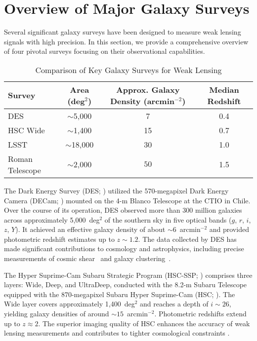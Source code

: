 \section{Overview of Major Galaxy Surveys}
Several significant galaxy surveys have been designed to measure weak lensing signals with high precision. In this section, we provide a comprehensive overview of four pivotal surveys focusing on their observational capabilities.
\begin{table}[h]
    \centering
    \caption{Comparison of Key Galaxy Surveys for Weak Lensing}
    \label{tab:survey_comparison}
    \begin{tabular}{lccc}
        \toprule
        \textbf{Survey} & \textbf{Area (deg$^2$)} & \textbf{Approx. Galaxy Density (arcmin$^{-2}$)} & \textbf{Median Redshift} \\
        \midrule
        DES & $\sim$5,000 &  7 & 0.4 \\
        HSC Wide & $\sim$1,400 &  15 & 0.7 \\
        LSST & $\sim$18,000 & 30 & 1.0 \\
        Roman Telescope & $\sim$2,000 & $50$ & 1.5 \\
        \bottomrule
    \end{tabular}
\end{table}

The Dark Energy Survey (DES; \citealt{2005astro.ph.10346T, 2018ApJS..239...18A, 2021ApJS..255...20A}) utilized the 570-megapixel Dark Energy Camera (DECam; \citealt{2015AJ....150..150F}) mounted on the 4-m Blanco Telescope at the CTIO in Chile. Over the course of its operation, DES observed more than 300 million galaxies across approximately 5,000~deg$^2$ of the southern sky in five optical bands ($g$, $r$, $i$, $z$, $Y$). It achieved an effective galaxy density of about $\sim 6$~arcmin$^{-2}$ and provided photometric redshift estimates up to $z \sim 1.2$. The data collected by DES has made significant contributions to cosmology and astrophysics, including precise measurements of cosmic shear~\citep{2022PhRvD.105b3514A} and galaxy clustering~\citep{2022PhRvD.105b3520A}. 

The Hyper Suprime-Cam Subaru Strategic Program (HSC-SSP; \citealt{2018PASJ...70S...4A}) comprises three layers: Wide, Deep, and UltraDeep, conducted with the 8.2-m Subaru Telescope equipped with the 870-megapixel Subaru Hyper Suprime-Cam (HSC; \citealt{2018PASJ...70S...1M}). The Wide layer covers approximately 1,400~deg$^2$ and reaches a depth of $i \sim 26$, yielding galaxy densities of around $\sim 15$~arcmin$^{-2}$. Photometric redshifts extend up to $z \approx 2$. The superior imaging quality of HSC enhances the accuracy of weak lensing measurements and contributes to tighter cosmological constraints \citep{2019PASJ...71...43H}.

